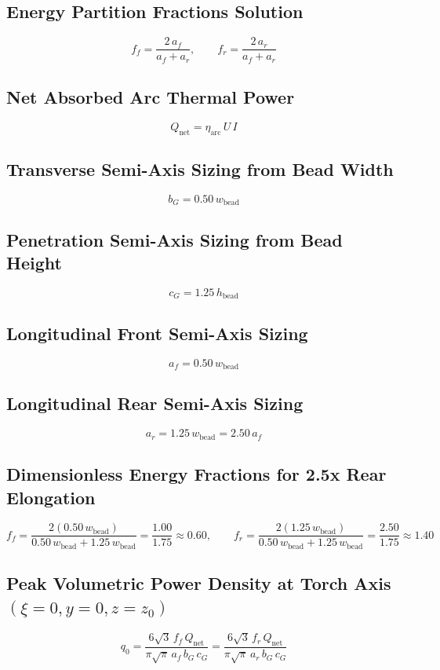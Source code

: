 \documentclass[10pt,a4paper]{article}
\begin{document}
\subsection*{Energy Partition Fractions Solution}
\[
f_f = \frac{2\,a_f}{a_f + a_r}, \qquad f_r = \frac{2\,a_r}{a_f + a_r}
\]

\subsection*{Net Absorbed Arc Thermal Power}
\[
Q_{\mathrm{net}} = \eta_{\mathrm{arc}}\,U\,I
\]

\subsection*{Transverse Semi-Axis Sizing from Bead Width}
\[
b_G = 0.50\,w_{\mathrm{bead}}
\]

\subsection*{Penetration Semi-Axis Sizing from Bead Height}
\[
c_G = 1.25\,h_{\mathrm{bead}}
\]

\subsection*{Longitudinal Front Semi-Axis Sizing}
\[
a_f = 0.50\,w_{\mathrm{bead}}
\]

\subsection*{Longitudinal Rear Semi-Axis Sizing}
\[
a_r = 1.25\,w_{\mathrm{bead}} = 2.50\,a_f
\]

\subsection*{Dimensionless Energy Fractions for 2.5x Rear Elongation}
\[
f_f = \frac{2(0.50\,w_{\mathrm{bead}})}{0.50\,w_{\mathrm{bead}} + 1.25\,w_{\mathrm{bead}}} = \frac{1.00}{1.75} \approx 0.60, \qquad f_r = \frac{2(1.25\,w_{\mathrm{bead}})}{0.50\,w_{\mathrm{bead}} + 1.25\,w_{\mathrm{bead}}} = \frac{2.50}{1.75} \approx 1.40
\]

\subsection*{Peak Volumetric Power Density at Torch Axis $(\xi=0, y=0, z=z_0)$}
\[
q_0 = \frac{6\sqrt{3}\,f_f\,Q_{\mathrm{net}}}{\pi\sqrt{\pi}\,a_f\,b_G\,c_G} = \frac{6\sqrt{3}\,f_r\,Q_{\mathrm{net}}}{\pi\sqrt{\pi}\,a_r\,b_G\,c_G}
\]
\end{document}

